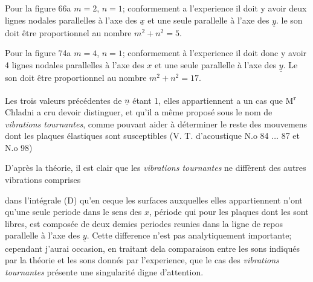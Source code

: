 \documentclass[11pt,a4paper]{article}
\begin{document}
Pour la figure 66a $m=2$, $n=1$;  conformement a l'experience
il  doit  y avoir deux lignes nodales parallelles à l'axe des
$\underline{x}$ et une seule parallelle à l'axe des $\underline{y}$.
 le son doit être proportionnel au nombre
$m^2+n^2=5$.

Pour la figure 74a $m=4$, $n=1$; conformement à l'experience
il doit donc y avoir 4 lignes nodales parallelles à l'axe
des $x$ et une seule parallelle à l'axe des $\underline{y}$.
Le son doit être proportionnel au nombre $m^2+n^2=17$.

Les trois valeurs précédentes de $\underline{n}$ étant 1, elles appartiennent
a un cas  que M\textsuperscript{r} Chladni a cru devoir
distinguer, et qu'il a même proposé sous le nom de
\emph{vibrations tournantes}, comme pouvant aider à déterminer
le reste des mouvemens dont les plaques élastiques
sont susceptibles (V. T. d'acoustique N.o 84 $\ldots$ 87 et N.o 98)

D'après la théorie, il est clair que les \emph{vibrations tournantes}
ne diffèrent des autres vibrations  comprises


dans l'intégrale (D) qu'en ceque  les surfaces
auxquelles elles appartiennent n'ont qu'une seule periode dans le
sens des $x$, période qui pour les plaques dont les  
sont libres, est composée de deux demies periodes reunies
dans la ligne de repos parallelle à l'axe des $\underline{y}$.
Cette difference n'est pas analytiquement importante;
cependant j'aurai occasion, en traitant dela comparaison
entre les sons  indiqués par la théorie et les sons donnés
par l'experience, que le cas des \emph{vibrations tournantes}
présente une singularité digne d'attention.
\end{document}
